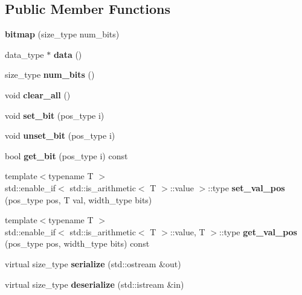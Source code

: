 \subsection*{Public Member Functions}
\begin{DoxyCompactItemize}
\item 
\mbox{\label{classdialog_1_1bitmap_a24d0f574de691d0a6a49042250b70402}} 
{\bfseries bitmap} (size\+\_\+type num\+\_\+bits)
\item 
\mbox{\label{classdialog_1_1bitmap_a0b900d1a8caeda35213c8891e092c61a}} 
data\+\_\+type $\ast$ {\bfseries data} ()
\item 
\mbox{\label{classdialog_1_1bitmap_a2066fd879c2e7c3d18ff590e9f1826b8}} 
size\+\_\+type {\bfseries num\+\_\+bits} ()
\item 
\mbox{\label{classdialog_1_1bitmap_a560fd4286efbe1d770926a4ceccc3d9a}} 
void {\bfseries clear\+\_\+all} ()
\item 
\mbox{\label{classdialog_1_1bitmap_abeda36a2708d0b87296f7c4322357421}} 
void {\bfseries set\+\_\+bit} (pos\+\_\+type i)
\item 
\mbox{\label{classdialog_1_1bitmap_a60bf0ac8d398e48e8f3c467999d0b1c8}} 
void {\bfseries unset\+\_\+bit} (pos\+\_\+type i)
\item 
\mbox{\label{classdialog_1_1bitmap_a50fa02f2e4a94c567f67761988c78d7f}} 
bool {\bfseries get\+\_\+bit} (pos\+\_\+type i) const
\item 
\mbox{\label{classdialog_1_1bitmap_a567ec662fb5fa68399b3097cc63c44ea}} 
{\footnotesize template$<$typename T $>$ }\\std\+::enable\+\_\+if$<$ std\+::is\+\_\+arithmetic$<$ T $>$\+::value $>$\+::type {\bfseries set\+\_\+val\+\_\+pos} (pos\+\_\+type pos, T val, width\+\_\+type bits)
\item 
\mbox{\label{classdialog_1_1bitmap_aa56b2e9be38fd068ac374f2f7a33120b}} 
{\footnotesize template$<$typename T $>$ }\\std\+::enable\+\_\+if$<$ std\+::is\+\_\+arithmetic$<$ T $>$\+::value, T $>$\+::type {\bfseries get\+\_\+val\+\_\+pos} (pos\+\_\+type pos, width\+\_\+type bits) const
\item 
\mbox{\label{classdialog_1_1bitmap_af93ff2660d3b790eee85692a41bdb823}} 
virtual size\+\_\+type {\bfseries serialize} (std\+::ostream \&out)
\item 
\mbox{\label{classdialog_1_1bitmap_a5c4c9a790b785bbc021d913a53cffe80}} 
virtual size\+\_\+type {\bfseries deserialize} (std\+::istream \&in)
\end{DoxyCompactItemize}
